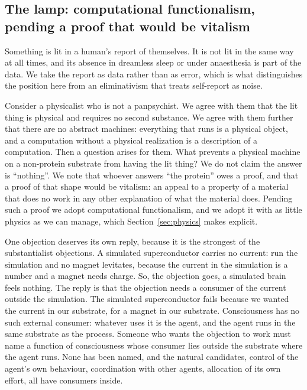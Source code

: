 \subsection{The lamp: computational functionalism, pending a proof that would be vitalism}
\label{sec:lamp}

Something is lit in a human's report of themselves. It is not lit in the same way at all times, and its
absence in dreamless sleep or under anaesthesia is part of the data. We take the report as data rather
than as error, which is what distinguishes the position here from an eliminativism that treats
self-report as noise.

Consider a physicalist who is not a panpsychist. We agree with them that the lit thing is physical and
requires no second substance. We agree with them further that there are no abstract machines: everything
that runs is a physical object, and a computation without a physical realization is a description of a
computation. Then a question arises for them. What prevents a physical machine on a non-protein
substrate from having the lit thing? We do not claim the answer is ``nothing''. We note that whoever
answers ``the protein'' owes a proof, and that a proof of that shape would be vitalism: an appeal to a
property of a material that does no work in any other explanation of what the material does. Pending
such a proof we adopt computational functionalism, and we adopt it with as little physics as we can
manage, which Section~\ref{sec:physics} makes explicit.

One objection deserves its own reply, because it is the strongest of the substantialist objections. A
simulated superconductor carries no current: run the simulation and no magnet levitates, because the
current in the simulation is a number and a magnet needs charge. So, the objection goes, a simulated
brain feels nothing. The reply is that the objection needs a consumer of the current outside the
simulation. The simulated superconductor fails because we wanted the current in our substrate, for a
magnet in our substrate. Consciousness has no such external consumer: whatever uses it is the agent,
and the agent runs in the same substrate as the process. Someone who wants the objection to work must
name a function of consciousness whose consumer lies outside the substrate where the agent runs. None
has been named, and the natural candidates, control of the agent's own behaviour, coordination with
other agents, allocation of its own effort, all have consumers inside.


